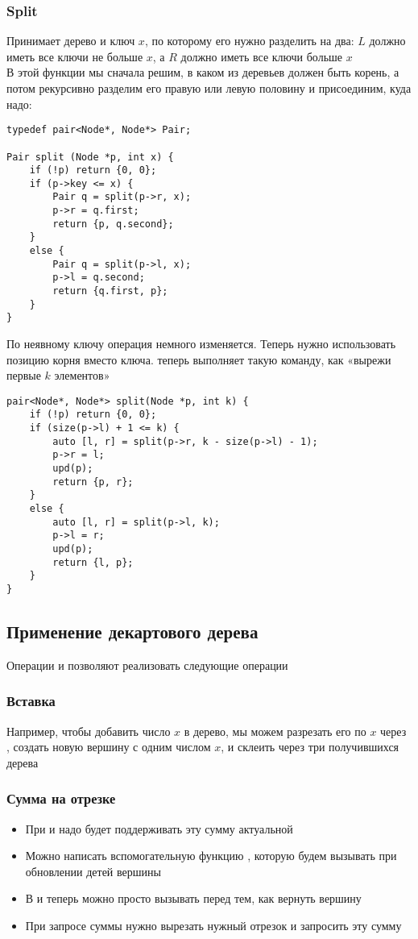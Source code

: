 \documentclass[a4paper]{article}
\begin{document}
\subsubsection{Split}
Принимает дерево и ключ $x$, по которому его нужно разделить на два: $L$ должно иметь все ключи не больше $x$, а $R$ должно иметь все ключи больше $x$\\[2mm]
\indent В этой функции мы сначала решим, в каком из деревьев должен быть корень, а потом рекурсивно разделим его правую или левую половину и присоединим, куда надо:
\begin{lstlisting}
typedef pair<Node*, Node*> Pair;

Pair split (Node *p, int x) {
    if (!p) return {0, 0};
    if (p->key <= x) {
        Pair q = split(p->r, x);
        p->r = q.first;
        return {p, q.second};
    }
    else {
        Pair q = split(p->l, x);
        p->l = q.second;
        return {q.first, p};
    }
}
\end{lstlisting}
По неявному ключу операция немного изменяется. Теперь нужно использовать позицию корня вместо ключа.  теперь выполняет такую команду, как «вырежи первые $k$ элементов»
\begin{lstlisting}
pair<Node*, Node*> split(Node *p, int k) {
    if (!p) return {0, 0};
    if (size(p->l) + 1 <= k) {
        auto [l, r] = split(p->r, k - size(p->l) - 1);
        p->r = l;
        upd(p);
        return {p, r};
    }
    else {
        auto [l, r] = split(p->l, k);
        p->l = r;
        upd(p);
        return {l, p};
    }
}
\end{lstlisting}

\subsection{Применение декартового дерева}
Операции  и  позволяют реализовать следующие операции
\subsubsection{Вставка}
Например, чтобы добавить число $x$ в дерево, мы можем разрезать его по $x$ через , создать новую вершину с одним числом $x$, и склеить через  три получившихся дерева

\subsubsection{Сумма на отрезке}
\begin{itemize}
    \item При  и  надо будет поддерживать эту сумму актуальной
    \item Можно написать вспомогательную функцию , которую будем вызывать при обновлении детей вершины
    \item В  и  теперь можно просто вызывать  перед тем, как вернуть вершину
    \item При запросе суммы нужно вырезать нужный отрезок и запросить эту сумму
\end{itemize}
\end{document}
